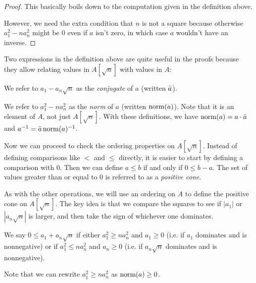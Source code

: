 \begin{proof}
  \leanok
  This basically boils down to the computation given in the definition above.

  However, we need the extra condition that $n$ is not a square because
  otherwise $a_1^2 - na_n^2$ might be 0 even if $a$ isn't zero, in which case
  $a$ wouldn't have an inverse.
\end{proof}


Two expressions in the definition above are quite useful in the proofs because they allow relating
values in $A[\sqrt{n}]$ with values in $A$:

\begin{definition}[Conjugate]
  \label{def:conj}
  \leanok
  We refer to $a_1 - a_n\sqrt{n}$ as the \emph{conjugate} of $a$ (written
  $\bar{a}$).
\end{definition}
\begin{definition}[Norm]
  \label{def:norm}
  \leanok
  We refer to $a_1^2 - na_n^2$ as the \emph{norm} of $a$ (written $\operatorname{norm}(a)$).
  Note that it is an element of $A$, not just $A[\sqrt{n}]$. With these
  definitions, we have $\operatorname{norm}(a) = a \cdot \bar{a}$ and $a^{-1} =
  \bar{a}\operatorname{norm}(a)^{-1}$.
\end{definition}


Now we can proceed to check the ordering properties on $A[\sqrt{n}]$. Instead
of defining comparisons like $<$ and $≤$ directly, it is easier to start by
defining a comparison with 0. Then we can define $a \leq b$ if and only if $0
\leq b - a$. The set of values greater than or equal to 0 is referred to as a
\emph{positive cone}.

As with the other operations, we will use an ordering on $A$ to define the
positive cone on $A[\sqrt{n}]$. The key idea is that we compare the squares
to see if $|a_1|$ or $|a_n\sqrt{n}|$ is larger, and then take the sign of
whichever one dominates.
\begin{definition}
  \label{def:posCone}
  \leanok
  We say $0 \leq a_1 + a_n\sqrt{n}$ if either $a_1^2 \geq na_n^2$ and $a_1 \geq
  0$ (i.e. if $a_1$ dominates and is nonnegative) or if $a_1^2 \leq na_n^2$ and $a_n \geq 0$
  (i.e. if $a_n\sqrt{n}$ dominates and is nonnegative).

  Note that we can rewrite $a_1^2 \geq na_n^2$ as $\operatorname{norm}(a) \geq 0$.
\end{definition}

